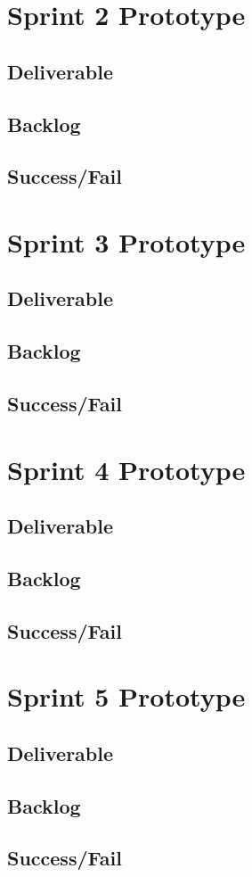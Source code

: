\section{Sprint 2 Prototype}
\subsection{Deliverable}
\subsection{Backlog}
\subsection{Success/Fail}

\section{Sprint 3 Prototype}
\subsection{Deliverable}
\subsection{Backlog}
\subsection{Success/Fail}

\section{Sprint 4 Prototype}
\subsection{Deliverable}
\subsection{Backlog}
\subsection{Success/Fail}

\section{Sprint 5 Prototype}
\subsection{Deliverable}
\subsection{Backlog}
\subsection{Success/Fail}

